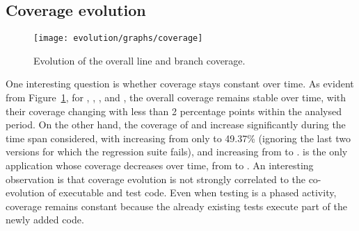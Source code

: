 


\subsection{Coverage evolution}

\begin{figure}[t]
\centering
\texttt{[image: evolution/graphs/coverage]}
\caption{Evolution of the overall line and branch coverage.}
\label{fig:coverage}
\end{figure}

One interesting question is whether coverage stays constant over time.
As evident from Figure~\ref{fig:coverage}, for \binutils, \git,
\memcached, and \redis, the overall coverage remains stable over time,
with their coverage changing with less than 2 percentage points within
the analysed period. On the other hand, the coverage of
\lighttpdtwo and \zeromq increase significantly during the time span
considered, with \lighttpdtwo increasing from only
\lighttpdtwoInitialCoverage to 49.37\% (ignoring the last two
versions for which the regression suite fails), and \zeromq increasing
from \zeromqInitialCoverage to \zeromqFinalCoverage. \beanstalkd is the only
application whose coverage decreases over time, from \beanstalkdInitialCoverage
to \beanstalkdFinalCoverage. An interesting observation is that coverage
evolution is not strongly correlated to the co-evolution of executable and test
code. Even when testing is a phased activity, coverage remains constant
because the already existing tests execute part of the newly added code.

